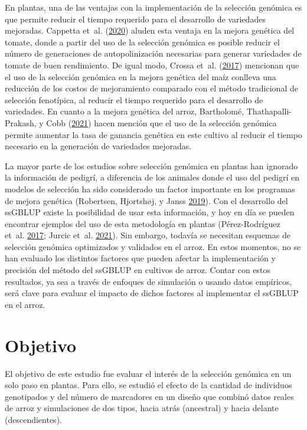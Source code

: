 \documentclass[11pt,spanish,a4paper,oneside,]{book} %
\begin{document}
En plantas, una de las ventajas con la implementación de la selección genómica es que permite reducir el tiempo requerido para el desarrollo de variedades mejoradas. Cappetta et~al. (\protect\hyperlink{ref-cite:64}{2020}) aluden esta ventaja en la mejora genética del tomate, donde a partir del uso de la selección genómica es posible reducir el número de generaciones de autopolinización necesarias para generar variedades de tomate de buen rendimiento. De igual modo, Crossa et~al. (\protect\hyperlink{ref-cite:37}{2017}) mencionan que el uso de la selección genómica en la mejora genética del maíz conlleva una reducción de los costos de mejoramiento comparado con el método tradicional de selección fenotípica, al reducir el tiempo requerido para el desarrollo de variedades. En cuanto a la mejora genética del arroz, Bartholomé, Thathapalli-Prakash, y Cobb (\protect\hyperlink{ref-cite:58}{2021}) hacen mención que el uso de la selección genómica permite aumentar la tasa de ganancia genética en este cultivo al reducir el tiempo necesario en la generación de variedades mejoradas.

La mayor parte de los estudios sobre selección genómica en plantas han ignorado la información de pedigrí, a diferencia de los animales donde el uso del pedigrí en modelos de selección ha sido considerado un factor importante en los programas de mejora genética (Robertsen, Hjortshøj, y Janss \protect\hyperlink{ref-cite:63}{2019}). Con el desarrollo del ssGBLUP existe la posibilidad de usar esta información, y hoy en día se pueden encontrar ejemplos del uso de esta metodología en plantas (Pérez-Rodríguez et~al. \protect\hyperlink{ref-cite:19}{2017}; Jurcic et~al. \protect\hyperlink{ref-cite:11}{2021}). Sin embargo, todavía se necesitan esquemas de selección genómica optimizados y validados en el arroz. En estos momentos, no se han evaluado los distintos factores que pueden afectar la implementación y precisión del método del ssGBLUP en cultivos de arroz. Contar con estos resultados, ya sea a través de enfoques de simulación o usando datos empíricos, será clave para evaluar el impacto de dichos factores al implementar el ssGBLUP en el arroz.

\clearpage\null\thispagestyle{empty}

\hypertarget{objetivo}{%
\chapter{Objetivo}\label{objetivo}}

El objetivo de este estudio fue evaluar el interés de la selección genómica en un solo paso en plantas. Para ello, se estudió el efecto de la cantidad de individuos genotipados y del número de marcadores en un diseño que combinó datos reales de arroz y simulaciones de dos tipos, hacia atrás (ancestral) y hacia delante (descendientes).
\end{document}

